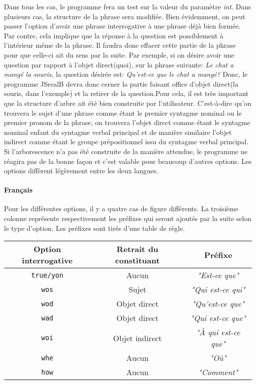 \documentclass[11pt]{article} %
\newcommand{\real}[1]{\emph{#1}}
\begin{document}
Dans tous les cas, le programme fera un test sur la valeur du paramètre
\emph{int}. Dans plusieurs cas, la structure de la phrase sera modifiée.
Bien évidemment, on peut passer l'option d'avoir une phrase interrogative
à une phrase déjà bien formée. Par contre, cela implique que la réponse
à la question est possiblement à l'intérieur même de la phrase. Il
faudra donc effacer cette partie de la phrase pour que celle-ci ait
du sens par la suite. Par exemple, si on désire avoir une question
par rapport à l'objet direct(quoi), sur la phrase suivante: \emph{Le
chat a mangé la souris, }la question désirée est: \emph{Qu'est-ce
que le chat a mangé?} Donc, le programme JSrealB devra donc cerner
la partie faisant office d'objet direct(la souris, dans l'exemple)
et la retirer de la question.Pour cela, il est très important que
la structure d'arbre ait été bien construite par l'utilisateur. C'est-à-dire
qu'on trouvera le sujet d'une phrase comme étant le premier syntagme
nominal ou le premier pronom de la phrase, on trouvera l'objet direct
comme étant le syntagme nominal enfant du syntagme verbal principal
et de manière similaire l'objet indirect comme étant le groupe prépositionnel
issu du syntagme verbal principal. Si l'arborescence n'a pas été construite
de la manière attendue, le programme ne réagira pas de la bonne façon
et c'est valable pour beaucoup d'autres options. Les options diffèrent
légèrement entre les deux langues.

\paragraph{Français}

Pour les différentes options, il y a quatre cas de figure différents.
La troisième colonne représente respectivement les préfixes qui seront
ajoutés par la suite selon le type d'option. Les préfixes sont tirés
d'une table de règle.

\begin{tabular}{|c|c|c|}
\hline 
Option interrogative & Retrait du constituant & Préfixe\\
\hline 
\hline 
\texttt{true/yon} & Aucun & \real{"Est-ce que"}\\
\hline 
\texttt{wos} & Sujet & \real{"Qui est-ce qui"}\\
\hline 
\texttt{wod} & Objet direct & \real{"Qu'est-ce que"}\\
\hline 
\texttt{wad} & Objet direct & \real{"Qui est-ce que"}\\
\hline 
\texttt{woi} & Objet indirect & \real{"À qui est-ce que"}\\
\hline 
\texttt{whe} & Aucun & \real{"Où"}\\
\hline 
\texttt{how} & Aucun & \real{"Comment"}\\
\hline 
\end{tabular}
\end{document}
